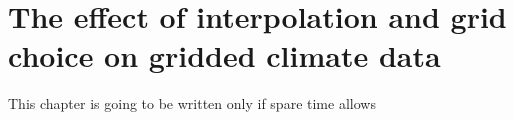 \chapter{The effect of interpolation and grid choice on gridded climate data}
This chapter is going to be written only if spare time allows